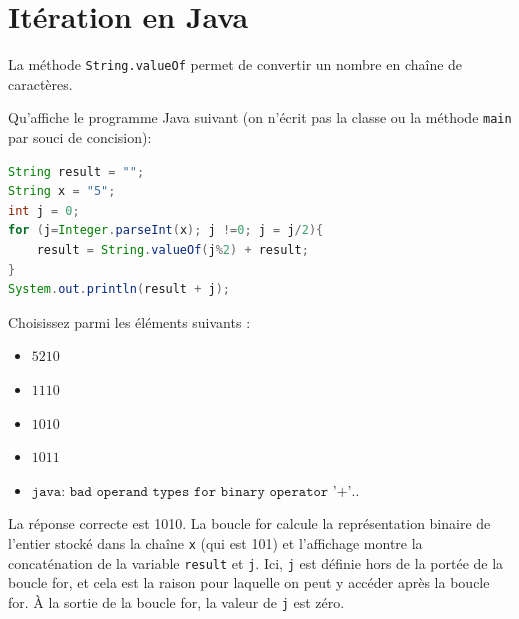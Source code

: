 \section{Itération en Java}
\begin{Exercice}[5 minutes]

    \begin{conseil}
La méthode \texttt{String.valueOf} permet de convertir un nombre en chaîne de caractères.
    \end{conseil}

Qu'affiche le programme Java suivant (on n'écrit pas la classe ou la méthode \texttt{main} par souci de concision):
\begin{lstlisting}[language=Java]
String result = "";
String x = "5";
int j = 0; 
for (j=Integer.parseInt(x); j !=0; j = j/2){
    result = String.valueOf(j%2) + result;
}
System.out.println(result + j);
\end{lstlisting}
Choisissez parmi les éléments suivants :
       
    \begin{itemize}
    \item \(5210\)
    \item \(1110\)
    \item \(1010\)
    \item \(1011\)
    \item \(\texttt{java: bad operand types for binary operator '+'..}\)
\end{itemize}
\begin{solution}
    La réponse correcte est 1010. La boucle for calcule la représentation binaire de l'entier stocké dans la chaîne \texttt{x} (qui est 101) et l'affichage montre la concaténation de la variable \texttt{result} et \texttt{j}. Ici, \texttt{j} est définie hors de la portée de la boucle for, et cela est la raison pour laquelle on peut y accéder après la boucle for. À la sortie de la boucle for, la valeur de \texttt{j} est zéro.
\end{solution}
\end{Exercice}

